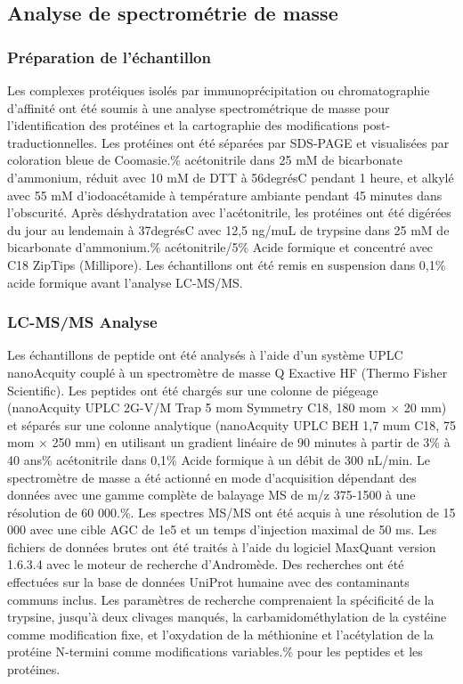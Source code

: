 \documentclass[11pt,a4paper]{article}
\begin{document}
\subsection{Analyse de spectrométrie de masse}

\subsubsection{Préparation de l'échantillon}

Les complexes protéiques isolés par immunoprécipitation ou chromatographie d'affinité ont été soumis à une analyse spectrométrique de masse pour l'identification des protéines et la cartographie des modifications post-traductionnelles. Les protéines ont été séparées par SDS-PAGE et visualisées par coloration bleue de Coomasie.\% acétonitrile dans 25 mM de bicarbonate d'ammonium, réduit avec 10 mM de DTT à 56degrésC pendant 1 heure, et alkylé avec 55 mM d'iodoacétamide à température ambiante pendant 45 minutes dans l'obscurité. Après déshydratation avec l'acétonitrile, les protéines ont été digérées du jour au lendemain à 37degrésC avec 12,5 ng/muL de trypsine dans 25 mM de bicarbonate d'ammonium.\% acétonitrile/5\% Acide formique et concentré avec C18 ZipTips (Millipore). Les échantillons ont été remis en suspension dans 0,1\% acide formique avant l'analyse LC-MS/MS.

\subsubsection{LC-MS/MS Analyse}

Les échantillons de peptide ont été analysés à l'aide d'un système UPLC nanoAcquity couplé à un spectromètre de masse Q Exactive HF (Thermo Fisher Scientific). Les peptides ont été chargés sur une colonne de piégeage (nanoAcquity UPLC 2G-V/M Trap 5 mom Symmetry C18, 180 mom × 20 mm) et séparés sur une colonne analytique (nanoAcquity UPLC BEH 1,7 mum C18, 75 mom × 250 mm) en utilisant un gradient linéaire de 90 minutes à partir de 3\% à 40 ans\% acétonitrile dans 0,1\% Acide formique à un débit de 300 nL/min. Le spectromètre de masse a été actionné en mode d'acquisition dépendant des données avec une gamme complète de balayage MS de m/z 375-1500 à une résolution de 60 000.\%. Les spectres MS/MS ont été acquis à une résolution de 15 000 avec une cible AGC de 1e5 et un temps d'injection maximal de 50 ms. Les fichiers de données brutes ont été traités à l'aide du logiciel MaxQuant version 1.6.3.4 avec le moteur de recherche d'Andromède. Des recherches ont été effectuées sur la base de données UniProt humaine avec des contaminants communs inclus. Les paramètres de recherche comprenaient la spécificité de la trypsine, jusqu'à deux clivages manqués, la carbamidométhylation de la cystéine comme modification fixe, et l'oxydation de la méthionine et l'acétylation de la protéine N-termini comme modifications variables.\% pour les peptides et les protéines.
\end{document}
